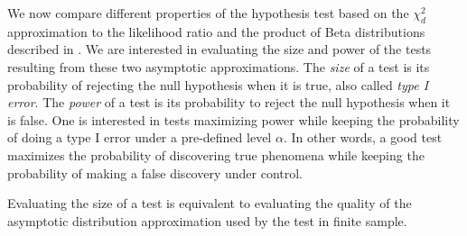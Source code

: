 
\begin{figure}[!htbp]
    \centering
\end{figure}

\cite{Tang2020}


\begin{figure}[!htbp]
    \centering
\end{figure}

\begin{figure}[!htbp]
    \centering
\end{figure}

\begin{figure}[!htbp]
    \centering
\end{figure}


We now compare different properties of the hypothesis test based on the $\chi^2_d$ approximation to the likelihood ratio and the product of Beta distributions described in . We are interested in evaluating the size and power of the tests resulting from these two asymptotic approximations. The \textit{size} of a test is its probability of rejecting the null hypothesis when it is true, also called \textit{type I error}. The \textit{power} of a test is its probability to reject the null hypothesis when it is false. One is interested in tests maximizing power while keeping the probability of doing a type I error under a pre-defined level $\alpha$. In other words, a good test maximizes the probability of discovering true phenomena while keeping the probability of making a false discovery under control.

Evaluating the size of a test is equivalent to evaluating the quality of the asymptotic distribution approximation used by the test in finite sample. 



